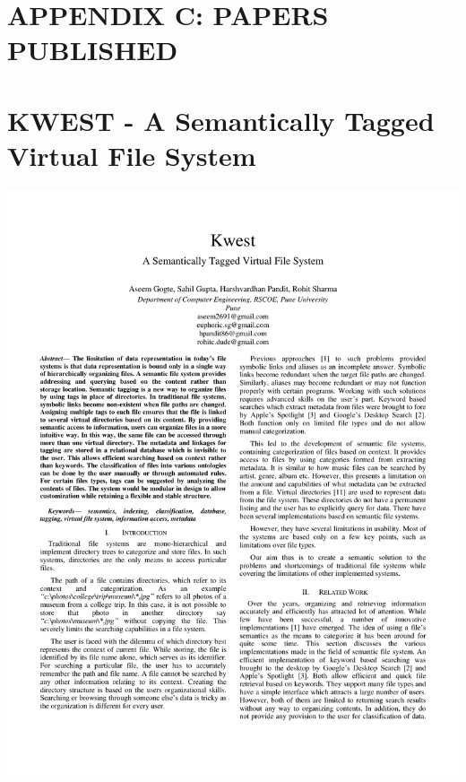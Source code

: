 \section*{APPENDIX C: PAPERS PUBLISHED}

\section{KWEST - A Semantically Tagged Virtual File System}
\hspace*{-1.5cm}
\includegraphics[page=1,scale=0.75]{./appendix/sem1.pdf}



